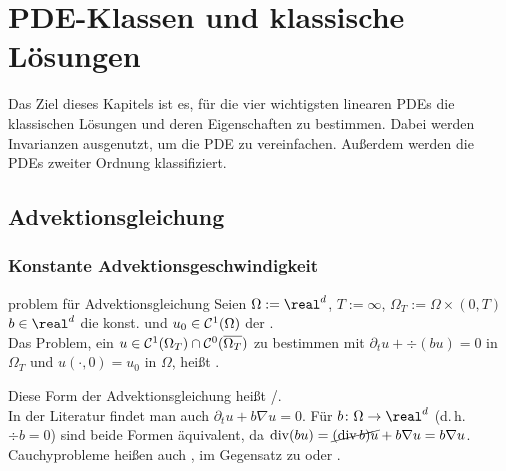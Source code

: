 \section{%
    PDE-Klassen und klassische Lösungen%
}

\begin{Bem}
    Das Ziel dieses Kapitels ist es, für die vier wichtigsten linearen PDEs die klassischen
    Lösungen und deren Eigenschaften zu bestimmen.
    Dabei werden Invarianzen ausgenutzt, um die PDE zu vereinfachen.
    Außerdem werden die PDEs zweiter Ordnung klassifiziert.
\end{Bem}

\subsection{%
    Advektionsgleichung%
}

\subsubsection{%
    Konstante Advektionsgeschwindigkeit%
}

\begin{Def}{problem für Advektionsgleichung}
    Seien $\Omega := \real^d$,
    $T := \infty$,
    $\Omega_T := \Omega \times (0, T)$
    $b \in \real^d$ die konst.  und
    $u_0 \in \C^1(\Omega)$ der .\\
    Das Problem, ein $u \in \C^1(\Omega_T) \cap \C^0(\overline{\Omega_T})$ zu bestimmen mit
    $\partial_t u + \div(bu) = 0$ in $\Omega_T$ und $u(\cdot, 0) = u_0$ in $\Omega$,
    heißt .
\end{Def}

\begin{Bem}
    Diese Form der Advektionsgleichung heißt /.\\
    In der Literatur findet man auch $\partial_t u + b \nabla u = 0$.
    Für $b\colon \Omega \to \real^d$  (d.\,h. $\div b = 0$)
    sind beide Formen äquivalent, da
    $\div(bu) = \cancel{(\div b) u} + b \nabla u = b \nabla u$.\\
    Cauchyprobleme heißen auch ,
    im Gegensatz zu  oder
    .
\end{Bem}

